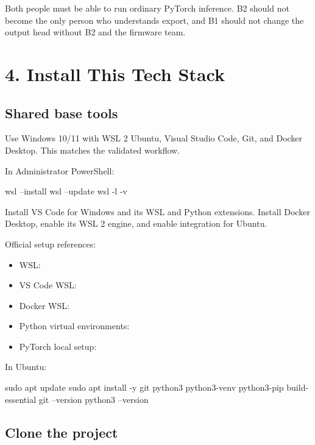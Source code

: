 \documentclass[11pt]{article}
\begin{document}
Both people must be able to run ordinary PyTorch inference. B2 should not become the only person who understands export, and B1 should not change the output head without B2 and the firmware team.

\section{4. Install This Tech Stack}

\subsection{Shared base tools}

Use Windows 10/11 with WSL 2 Ubuntu, Visual Studio Code, Git, and Docker Desktop. This matches the validated workflow.

In Administrator PowerShell:

\begin{Code}
wsl --install
wsl --update
wsl -l -v
\end{Code}

Install VS Code for Windows and its WSL and Python extensions. Install Docker Desktop, enable its WSL 2 engine, and enable integration for Ubuntu.

Official setup references:

\begin{itemize}
\item WSL: 
\item VS Code WSL: 
\item Docker WSL: 
\item Python virtual environments: 
\item PyTorch local setup: 
\end{itemize}

In Ubuntu:

\begin{Code}
sudo apt update
sudo apt install -y git python3 python3-venv python3-pip build-essential
git --version
python3 --version
\end{Code}

\subsection{Clone the project}
\end{document}
